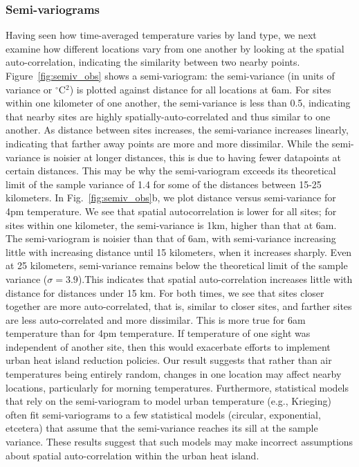\documentclass[draft,linenumbers]{agujournal}
\begin{document}
\subsubsection{Semi-variograms}
Having seen how time-averaged temperature varies by land type, we next examine how different locations vary from one another by looking at the spatial auto-correlation, indicating the similarity between two nearby points. Figure~\ref{fig:semiv_obs} shows a semi-variogram: the semi-variance (in units of variance or $^\circ$C$^2$) is plotted against distance for all locations at 6am. For sites within one kilometer of one another, the semi-variance is less than 0.5, indicating that nearby sites are highly spatially-auto-correlated and thus similar to one another. As distance between sites increases, the semi-variance increases linearly, indicating that farther away points are more and more dissimilar. While the semi-variance is noisier at longer distances, this is due to having fewer datapoints at certain distances. This may be why the semi-variogram exceeds its theoretical limit of the sample variance of 1.4 for some of the distances between 15-25 kilometers. 
In Fig.~\ref{fig:semiv_obs}b, we plot distance versus semi-variance for 4pm temperature. We see that spatial autocorrelation is lower for all sites; for sites within one kilometer, the semi-variance is 1km, higher than that at 6am. The semi-variogram is noisier than that of 6am, with semi-variance increasing little with increasing distance until 15 kilometers, when it increases sharply. Even at 25 kilometers, semi-variance remains below the theoretical limit of the sample variance ($\sigma = 3.9$).This indicates that spatial auto-correlation increases little with distance for distances under 15 km.
For both times, we see that sites closer together are more auto-correlated, that is, similar to closer sites, and farther sites are less auto-correlated and more dissimilar. This is more true for 6am temperature than for 4pm temperature. If temperature of one sight was independent of another site, then this would exacerbate efforts to implement urban heat island reduction policies. Our result suggests that rather than air temperatures being entirely random, changes in one location may affect nearby locations, particularly for morning temperatures. Furthermore, statistical models that rely on the semi-variogram to model urban temperature (e.g., Krieging) often fit semi-variograms to a few statistical models (circular, exponential, etcetera) that assume that the semi-variance reaches its sill at the sample variance. These results suggest that such models may make incorrect assumptions about spatial auto-correlation within the urban heat island. 
\end{document}
